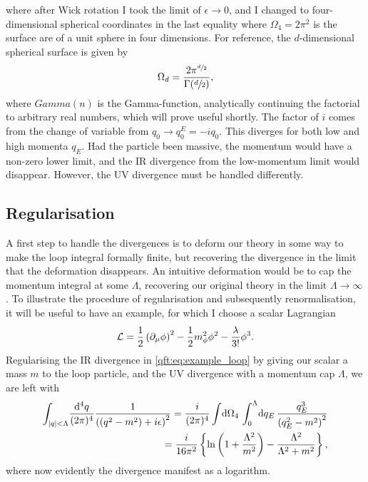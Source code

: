 \documentclass[../main.tex]{subfiles}
\begin{document}
where after Wick rotation I took the limit of \(\epsilon \to 0\), and I changed to four-dimensional spherical coordinates in the last equality where \(\Omega_4 = 2\pi^2\) is the surface are of a unit sphere in four dimensions.
For reference, the \(d\)-dimensional spherical surface is given by
\begin{equation}
  \Omega_d = \frac{2\pi^{\sfrac{d}{2}}}{\Gamma(\sfrac{d}{2})},
\end{equation}
where \(Gamma(n)\) is the Gamma-function, analytically continuing the factorial to arbitrary real numbers, which will prove useful shortly.
The factor of \(i\) comes from the change of variable from \(q_0 \to q^E_0 = -iq_0\).
This diverges for both low and high momenta \(q_E\).
Had the particle been massive, the momentum would have a non-zero lower limit, and the IR divergence from the low-momentum limit would disappear.
However, the UV divergence must be handled differently.


\subsection{Regularisation}
\label{qft:subsec:regularisation}
A first step to handle the divergences is to deform our theory in some way to
make the loop integral formally finite, but recovering the divergence in the
limit that the deformation disappears. An intuitive deformation would be to cap
the momentum integral at some \(\Lambda\), recovering our original theory in
the limit \(\Lambda \to \infty\). To illustrate the procedure of regularisation
and subsequently renormalisation, it will be useful to have an example, for
which I choose a scalar Lagrangian
\begin{equation}
  \label{qft:eq:example_lagrangian}
  \L = \frac{1}{2} \pclosed{\partial_\mu\phi}^2 - \frac{1}{2}m_\phi^2 \phi^2 - \frac{\lambda}{3!} \phi^3.
\end{equation}
Regularising the IR divergence in \cref{qft:eq:example_loop} by giving our scalar a mass \(m\) to the loop particle, and the UV divergence with a momentum cap \(\Lambda\), we are left with
\begin{align}
  \label{qft:eq:cut-off_loop_example}
  \nonumber
  \int_{\abs{q} < \Lambda}\! \frac{\mathrm{d}^4q}{(2\pi)^4}
  \frac{1}{\pclosed{(q^2-m^2)+i\epsilon}^2} = \frac{i}{(2\pi)^4}
  \integral{\Omega_4} \integral[_0^\Lambda]{q_E} \frac{q_E^3}{\pclosed{q_E^2
      -
  m^2}^2} \\
  = \frac{i}{16\pi^2} \cclosed{\ln\pclosed{1 + \frac{\Lambda^2}{m^2}} -
    \frac{\Lambda^2}{\Lambda^2 + m^2}},
\end{align}
where now evidently the divergence manifest as a logarithm.
\medskip
\end{document}
